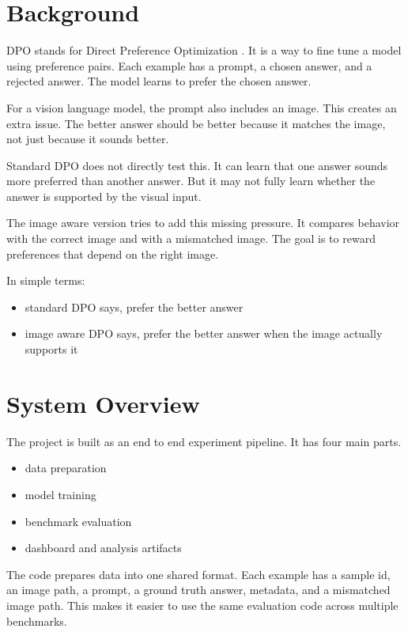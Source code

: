 \documentclass{article}
\begin{document}
\section{Background}
DPO stands for Direct Preference Optimization \cite{dpo}.
It is a way to fine tune a model using preference pairs.
Each example has a prompt, a chosen answer, and a rejected answer.
The model learns to prefer the chosen answer.

For a vision language model, the prompt also includes an image.
This creates an extra issue.
The better answer should be better because it matches the image, not just because it sounds better.

Standard DPO does not directly test this.
It can learn that one answer sounds more preferred than another answer.
But it may not fully learn whether the answer is supported by the visual input.

The image aware version tries to add this missing pressure.
It compares behavior with the correct image and with a mismatched image.
The goal is to reward preferences that depend on the right image.

In simple terms:

\begin{itemize}
    \item standard DPO says, prefer the better answer
    \item image aware DPO says, prefer the better answer when the image actually supports it
\end{itemize}

\section{System Overview}
The project is built as an end to end experiment pipeline.
It has four main parts.

\begin{itemize}
    \item data preparation
    \item model training
    \item benchmark evaluation
    \item dashboard and analysis artifacts
\end{itemize}

The code prepares data into one shared format.
Each example has a sample id, an image path, a prompt, a ground truth answer, metadata, and a mismatched image path.
This makes it easier to use the same evaluation code across multiple benchmarks.
\end{document}
